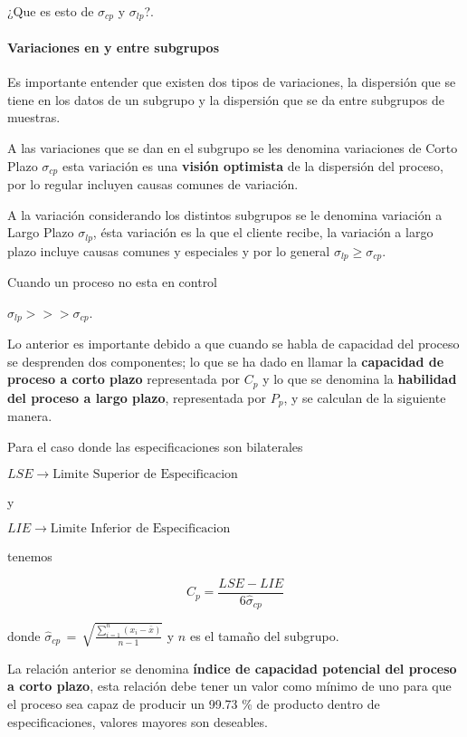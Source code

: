 \documentclass[spanish]{report}
\begin{document}
¿Que es esto de $\sigma_{cp}$ y $\sigma_{lp}$?. 

\paragraph{Variaciones en y entre subgrupos}

Es importante entender que existen dos tipos de variaciones, la dispersión que se tiene en los datos de un subgrupo y la dispersión que se da entre subgrupos de muestras. 

A las variaciones que se dan en el subgrupo se les denomina variaciones de Corto Plazo $\sigma_{cp}$ esta variación es una \textbf{visión optimista} de la dispersión del proceso, por lo regular incluyen causas comunes de variación.

A la variación considerando los distintos subgrupos se le denomina variación a Largo Plazo $\sigma_{lp}$, ésta variación es la que el cliente recibe, la variación a largo plazo incluye causas comunes y especiales y por lo general $\sigma_{lp}\geq\sigma_{cp}$.

Cuando un proceso no esta en control

$\sigma_{lp}>>>\sigma_{cp}$.
 
Lo anterior es importante debido a que cuando se habla de capacidad del proceso se desprenden dos componentes; lo que se ha dado en llamar la \textbf{capacidad de proceso a corto plazo} representada por $C_{p}$ y lo que se denomina la \textbf{habilidad del proceso a largo plazo}, representada por $P_{p}$, y se calculan de la siguiente manera.

\medskip 
Para el caso donde las especificaciones son bilaterales

$LSE\rightarrow\text{Limite Superior de Especificacion}$

y

$LIE\rightarrow\text{Limite Inferior de Especificacion}$

tenemos

\begin{equation}
{C}_{p}=\frac{LSE-LIE}{6\hat{\sigma}_{cp}}
\label{c2eq10}
\end{equation}

donde $\hat{\sigma}_{cp}\,=\,\sqrt{\frac{\sum_{i=1}^{n}(x_{i}-\bar{x})}{n-1}}$ y $n$ es el tamaño del subgrupo.

La relación anterior se denomina \textbf{índice de capacidad potencial
del proceso a corto plazo}, esta relación debe tener un valor como
mínimo de uno para que el proceso sea capaz de producir un 99.73 \%
de producto dentro de especificaciones, valores mayores son deseables.
\end{document}
